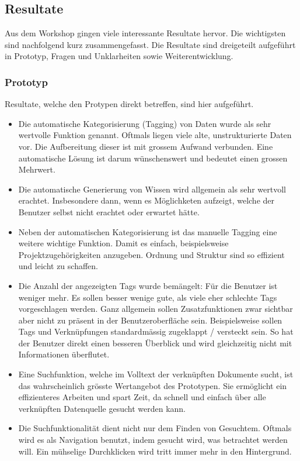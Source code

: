 \subsection{Resultate}

Aus dem Workshop gingen viele interessante Resultate hervor. Die wichtigsten sind nachfolgend kurz zusammengefasst. Die Resultate sind dreigeteilt aufgeführt in Prototyp, Fragen und Unklarheiten sowie Weiterentwicklung.

\subsubsection{Prototyp}
Resultate, welche den Protypen direkt betreffen, sind hier aufgeführt.

\begin{itemize}
    \item Die automatische Kategorisierung (Tagging) von Daten wurde als sehr wertvolle Funktion genannt. Oftmals liegen viele alte, un\-struk\-tu\-rier\-te Daten vor. Die Aufbereitung dieser ist mit grossem Aufwand verbunden. Eine automatische Lösung ist darum wünsch\-ens\-wert und bedeutet einen grossen Mehrwert.
    \item Die automatische Generierung von Wissen wird allgemein als sehr wertvoll erachtet. Insbesondere dann, wenn es Mög\-lich\-ket\-en aufzeigt, welche der Benutzer selbst nicht erachtet oder erwartet hätte.
    \item Neben der automatischen Kategorisierung ist das manuelle Tagging eine weitere wichtige Funktion. Damit es einfach, beispielsweise Projektzugehörigkeiten anzugeben. Ordnung und Struktur sind so effizient und leicht zu schaffen.
    \item Die Anzahl der angezeigten Tags wurde bemängelt: Für die Benutzer ist weniger mehr. Es sollen besser wenige gute, als viele eher schlechte Tags vorgeschlagen werden. Ganz allgemein sollen Zusatzfunktionen zwar sichtbar aber nicht zu präsent in der Benutzeroberfläche sein. Beispielsweise sollen Tags und Verknüpfungen standardmässig zugeklappt / versteckt sein. So hat der Benutzer direkt einen besseren Überblick und wird gleichzeitig nicht mit Informationen überflutet.
    \item Eine Suchfunktion, welche im Volltext der verknüpften Dokumente sucht, ist das wahrscheinlich grösste Wertangebot des Prototypen. Sie ermöglicht ein effizienteres Arbeiten und spart Zeit, da schnell und einfach über alle verknüpften Datenquelle gesucht werden kann.
    \item Die Suchfunktionalität dient nicht nur dem Finden von Gesuchtem. Oftmals wird es als Navigation benutzt, indem gesucht wird, was betrachtet werden will. Ein mühselige Durchklicken wird tritt immer mehr in den Hintergrund.
\end{itemize}

